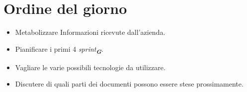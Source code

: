 

\section{Ordine del giorno}

\begin{itemize}
    \item Metabolizzare Informazioni ricevute dall'azienda.
    \item Pianificare i primi 4 \emph{sprint}\textsubscript{\textit{\textbf{G}}}.
    \item Vagliare le varie possibili tecnologie da utilizzare.
    \item Discutere di quali parti dei documenti possono essere stese prossimamente.
\end{itemize}